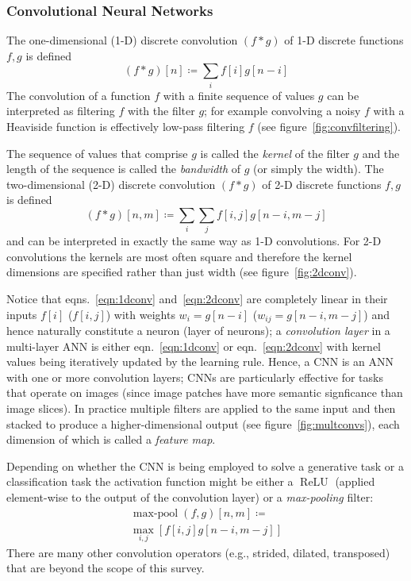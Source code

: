 \subsubsection{Convolutional Neural Networks}
The one-dimensional (1-D) discrete convolution \((f*g)\) of 1-D discrete functions \(f,g\) is defined
\begin{equation}
    (f*g)[n]\coloneqq \sum _{i} f[i]g[n-i]
    \label{eqn:1dconv}
\end{equation}
The convolution of a function \(f\) with a finite sequence of values \(g\) can be interpreted as filtering \(f\) with the filter \(g\); for example convolving a noisy \(f\) with a Heaviside function is effectively low-pass filtering \(f\) (see figure~\ref{fig:convfiltering}).

%
The sequence of values that comprise \(g\) is called the \textit{kernel} of the filter \(g\) and the length of the sequence is called the \textit{bandwidth} of \(g\) (or simply the width).
%
The two-dimensional (2-D) discrete convolution \((f*g)\) of 2-D discrete functions \(f,g\) is defined
\begin{equation}
    (f*g)[n, m]\coloneqq \sum _{i}\sum _{j}f[i, j]g[n-i, m-j]
    \label{eqn:2dconv}
\end{equation}
and can be interpreted in exactly the same way as 1-D convolutions.
%
For 2-D convolutions the kernels are most often square and therefore the kernel dimensions are specified rather than just width (see figure~\ref{fig:2dconv}).


Notice that eqns.~\eqref{eqn:1dconv} and~\eqref{eqn:2dconv} are completely linear in their inputs \(f[i]\) (\(f[i,j]\)) with weights \(w_i = g[n-i]\) (\(w_{ij} = g[n-i, m-j]\)) and hence naturally constitute a neuron (layer of neurons); a \textit{convolution layer} in a multi-layer ANN is either eqn.~\eqref{eqn:1dconv} or eqn.~\eqref{eqn:2dconv} with kernel values being iteratively updated by the learning rule.
%
Hence, a CNN is an ANN with one or more convolution layers; CNNs are particularly effective for tasks that operate on images (since image patches have more semantic signficance than image slices).
%
In practice multiple filters are applied to the same input and then stacked to produce a higher-dimensional output (see figure~\ref{fig:multconvs}), each dimension of which is called a \textit{feature map}.

%
Depending on whether the CNN is being employed to solve a generative task or a classification task the activation function might be either a \(\operatorname{ReLU}\) (applied element-wise to the output of the convolution layer) or a \textit{max-pooling} filter:
\begin{multline}
    \operatorname{max-pool}(f,g)[n, m]\coloneqq\\ \max_{i,j}\left[ f[i, j]g[n-i, m-j] \right]
    \label{eqn:2dpool}
\end{multline}
There are many other convolution operators (e.g., strided, dilated, transposed) that are beyond the scope of this survey\cite{dumoulin2016guide}.

